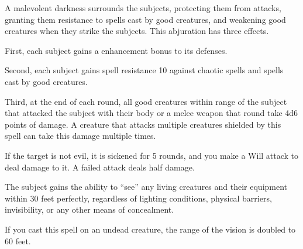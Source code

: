 \begin{comment}
\subsubsection{U-Z}
\end{comment}

\spelldur{\durshort \dismissable}
\begin{spelleffect}
    A malevolent darkness surrounds the subjects, protecting them from attacks, granting them resistance to spells cast by good creatures, and weakening good creatures when they strike the subjects. This abjuration has three effects.
    \par First, each subject gains a  enhancement bonus to its defenses.
    \par Second, each subject gains spell resistance 10 against chaotic spells and spells cast by good creatures.
    \par Third, at the end of each round, all good creatures within \rngclose range of the subject that attacked the subject with their body or a melee weapon that round take 4d6 points of damage. A creature that attacks multiple creatures shielded by this spell can take this damage multiple times.
\end{spelleffect}

\begin{spelleffect}
    If the target is not evil, it is sickened for 5 rounds, and you make a Will attack to deal damage to it. A failed attack deals half damage.
\end{spelleffect}

\spelldur{\durlong \dismissable}
\begin{spelleffect}
    The subject gains the ability to ``see'' any living creatures and their equipment within 30 feet perfectly, regardless of lighting conditions, physical barriers, invisibility, or any other means of concealment.

    If you cast this spell on an undead creature, the range of the vision is doubled to 60 feet.
\end{spelleffect}

